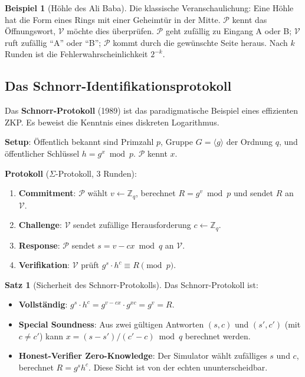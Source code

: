 ﻿\documentclass[a4paper,12pt]{scrreprt}
\theoremstyle{definition}
\newtheorem{beispiel}{Beispiel}[section]
\newtheorem{satz}{Satz}[section]
\begin{document}
\begin{beispiel}[Höhle des Ali Baba]
Die klassische Veranschaulichung: Eine Höhle hat die Form eines Rings mit einer Geheimtür in der Mitte. $\mathcal{P}$ kennt das Öffnungswort, $\mathcal{V}$ möchte dies überprüfen. $\mathcal{P}$ geht zufällig zu Eingang A oder B; $\mathcal{V}$ ruft zufällig ``A'' oder ``B''; $\mathcal{P}$ kommt durch die gewünschte Seite heraus. Nach $k$ Runden ist die Fehlerwahrscheinlichkeit $2^{-k}$.
\end{beispiel}

\subsection{Das Schnorr-Identifikationsprotokoll}

Das \textbf{Schnorr-Protokoll} (1989) ist das paradigmatische Beispiel eines effizienten ZKP. Es beweist die Kenntnis eines diskreten Logarithmus.

\textbf{Setup}: Öffentlich bekannt sind Primzahl $p$, Gruppe $G = \langle g \rangle$ der Ordnung $q$, und öffentlicher Schlüssel $h = g^x \bmod p$. $\mathcal{P}$ kennt $x$.

\textbf{Protokoll} ($\Sigma$-Protokoll, 3 Runden):
\begin{enumerate}
    \item \textbf{Commitment}: $\mathcal{P}$ wählt $v \leftarrow \mathbb{Z}_q$, berechnet $R = g^v \bmod p$ und sendet $R$ an $\mathcal{V}$.
    \item \textbf{Challenge}: $\mathcal{V}$ sendet zufällige Herausforderung $c \leftarrow \mathbb{Z}_q$.
    \item \textbf{Response}: $\mathcal{P}$ sendet $s = v - cx \bmod q$ an $\mathcal{V}$.
    \item \textbf{Verifikation}: $\mathcal{V}$ prüft $g^s \cdot h^c \equiv R \pmod{p}$.
\end{enumerate}

\begin{satz}[Sicherheit des Schnorr-Protokolls]
Das Schnorr-Protokoll ist:
\begin{itemize}
    \item \textbf{Vollständig}: $g^s \cdot h^c = g^{v-cx} \cdot g^{xc} = g^v = R$. \checkmark
    \item \textbf{Special Soundness}: Aus zwei gültigen Antworten $(s, c)$ und $(s', c')$ (mit $c \neq c'$) kann $x = (s-s')/(c'-c) \bmod q$ berechnet werden.
    \item \textbf{Honest-Verifier Zero-Knowledge}: Der Simulator wählt zufälliges $s$ und $c$, berechnet $R = g^s h^c$. Diese Sicht ist von der echten ununterscheidbar.
\end{itemize}
\end{satz}
\end{document}
